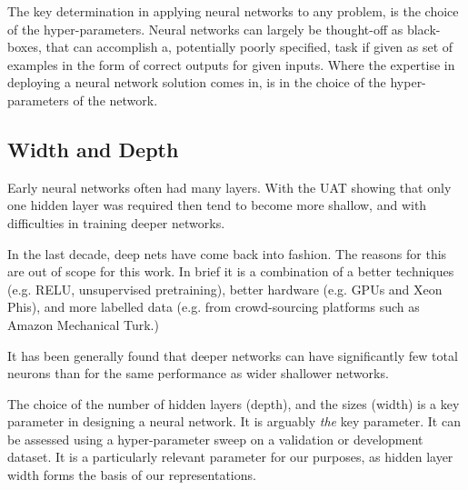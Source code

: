 \documentclass[12pt,parskip]{komatufte}
\begin{document}
The key determination in applying neural networks to any problem,
is the choice of the hyper-parameters.
Neural networks can largely be thought-off as black-boxes,
that can accomplish a, potentially poorly specified, task if given as set of examples in the form of correct outputs for given inputs.
Where the expertise in deploying a neural network solution comes in, is in the choice of the hyper-parameters of the network.

\subsection{Width and Depth}

Early neural networks often had many layers.
With the UAT showing that only one hidden layer was required then tend to become more shallow, and
with difficulties in training deeper networks.

In the last decade, deep nets have come back into fashion.
The reasons for this are out of scope for this work.
In brief it is a combination of a better techniques (e.g. RELU, unsupervised pretraining),
better hardware (e.g. GPUs and Xeon Phis), and more labelled data (e.g. from crowd-sourcing platforms such as Amazon Mechanical Turk.)

It has been generally found that deeper networks can have significantly few total neurons than for the same performance as wider shallower networks.

The choice of the number of hidden layers (depth),
and the sizes (width) is a key parameter in designing a neural network.
It is arguably \emph{the} key parameter.
It can be assessed using a hyper-parameter sweep on a validation or development dataset.
It is a particularly relevant parameter for our purposes, as hidden layer width forms the basis of our representations.
\end{document}
